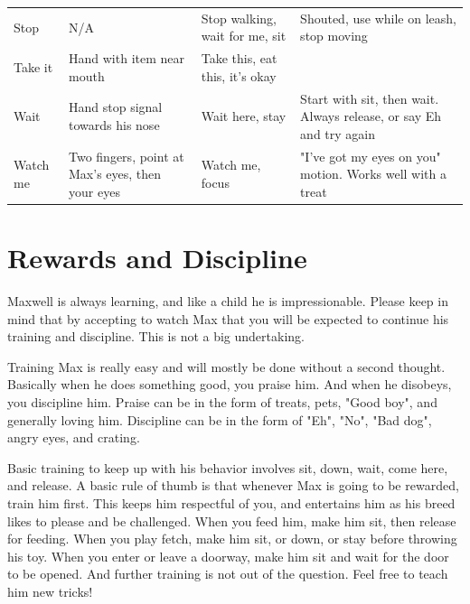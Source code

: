 \documentclass[pdftex,12pt]{article}
\begin{document}
\begin{table}[H]
\begin{adjustwidth}{-4.5cm}{-4.5cm}
\begin{center}
\begin{tabular}{lp{}p{}p{}}
                Stop        & N/A                                              & Stop walking, wait for me, sit                        & Shouted, use while on leash, stop moving                           \\
                Take it     & Hand with item near mouth                        & Take this, eat this, it's okay                        &                                                                    \\
                Wait        & Hand stop signal towards his nose                & Wait here, stay                                       & Start with sit, then wait. Always release, or say Eh and try again \\
                Watch me    & Two fingers, point at Max's eyes, then your eyes & Watch me, focus                                       & "I've got my eyes on you" motion. Works well with a treat         
            \end{tabular}
            \egroup
        \end{center}
    \end{adjustwidth}
\end{table}

\newpage
\section{Rewards and Discipline}

Maxwell is always learning, and like a child he is impressionable. Please keep
in mind that by accepting to watch Max that you will be expected to continue his
training and discipline. This is not a big undertaking. 

\bigskip

Training Max is really easy and will mostly be done without a second thought.
Basically when he does something good, you praise him. And when he disobeys, you
discipline him. Praise can be in the form of treats, pets, "Good boy", and
generally loving him. Discipline can be in the form of "Eh", "No", "Bad dog",
angry eyes, and crating. 

\bigskip

Basic training to keep up with his behavior involves sit, down, wait, come
here, and release. A basic rule of thumb is that whenever Max is going to be
rewarded, train him first. This keeps him respectful of you, and entertains him
as his breed likes to please and be challenged. When you feed him, make him sit,
then release for feeding. When you play fetch, make him sit, or down, or stay
before throwing his toy. When you enter or leave a doorway, make him sit and
wait for the door to be opened. And further training is not out of the question.
Feel free to teach him new tricks!
\end{document}
